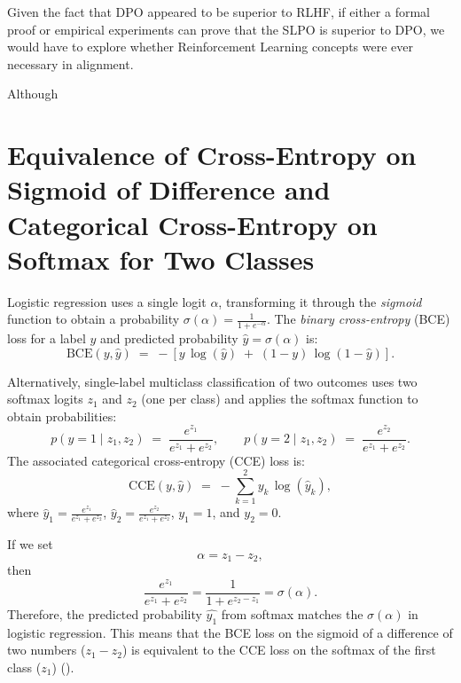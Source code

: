 \documentclass[twoside,11pt]{article}
\begin{document}
Given the fact that DPO appeared to be superior to RLHF, if
either a formal proof or empirical experiments can prove that 
the SLPO is superior to DPO, we would have to explore whether
Reinforcement Learning concepts were ever necessary in alignment. 

Although



\newpage

\appendix



\section{Equivalence of Cross-Entropy on Sigmoid of Difference
and Categorical Cross-Entropy on Softmax for Two Classes}

\label{app:ce-of-diff-same-as-softmax}

Logistic regression uses 
a single logit \(\alpha\), transforming it through the \emph{sigmoid} function to obtain 
a probability \(\sigma(\alpha) = \frac{1}{1 + e^{-\alpha}} \). The \emph{binary cross-entropy} 
(BCE) loss for a label $y$ and predicted probability \(\hat{y} = \sigma(\alpha)\) is:
\[
  \text{BCE}(y, \hat{y})
  \;=\;
  - \left[
      y \,\log(\hat{y})
      \;+\;
      (1 - y)\,\log (1 - \hat{y})
    \right].
\]

Alternatively, single-label multiclass classification of two 
outcomes uses two softmax logits \(z_1\) and \(z_2\) (one per class) 
and applies the softmax function to obtain probabilities:
\[
  p(y=1 \mid z_1, z_2)
  \;=\;
  \frac{e^{z_1}}{e^{z_1} + e^{z_2}},
  \qquad
  p(y=2 \mid z_1, z_2)
  \;=\;
  \frac{e^{z_2}}{e^{z_1} + e^{z_2}}.
\]
The associated categorical cross-entropy (CCE) loss is: 
\[
  \text{CCE}(y, \hat{y})
  \;=\;
  -\sum_{k=1}^2 y_k \,\log (\hat{y}_k ),
\]
where \(\hat{y}_1 = \frac{e^{z_1}}{e^{z_1} + e^{z_2}}\), 
\(\hat{y}_2 = \frac{e^{z_2}}{e^{z_1} + e^{z_2}}\), 
\(y_1 = 1\), and
\(y_2 = 0\). 

If we set 
\[
  \alpha = z_1 - z_2,
\]
then
\[
  \frac{e^{z_1}}{e^{z_1} + e^{z_2}}
  =
  \frac{1}{1 + e^{z_2 - z_1}}
  =
  \sigma(\alpha).
\] 
Therefore, the predicted probability $\hat{y_1}$ from softmax
matches the \(\sigma(\alpha)\) in logistic regression. This means that 
the BCE loss on the sigmoid of a difference of two numbers ($z_1 - z_2$) 
is equivalent
to the CCE loss on the softmax of the first class
($z_1$) (\cite{Goodfellow-et-al-2016}).
\end{document}
